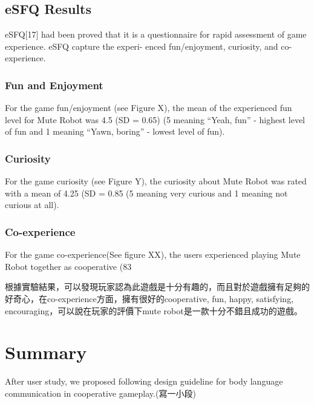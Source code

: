 \documentclass{sigchi}
\begin{document}
\subsection{eSFQ Results}

eSFQ[17] had been proved that it is a questionnaire for rapid assessment of game experience. eSFQ capture the experi- enced fun/enjoyment, curiosity, and co-experience. 


\subsubsection{Fun and Enjoyment}
For the game fun/enjoyment (see Figure X), the mean of the experienced fun level for Mute Robot was 4.5 (SD = 0.65) (5 meaning “Yeah, fun” - highest level of fun and 1 meaning “Yawn, boring” - lowest level of fun). 

\subsubsection{Curiosity}
For the game curiosity (see Figure Y), the curiosity about Mute Robot was rated with a mean of 4.25 (SD = 0.85 (5 meaning very curious and 1 meaning not curious at all).

\subsubsection{Co-experience}

For the game co-experience(See figure XX), the users experienced playing Mute Robot together as cooperative (83%


根據實驗結果，可以發現玩家認為此遊戲是十分有趣的，而且對於遊戲擁有足夠的好奇心，在co-experience方面，擁有很好的cooperative, fun, happy, satisfying, encouraging，可以說在玩家的評價下mute robot是一款十分不錯且成功的遊戲。

\section{Summary}

After user study, we proposed following design guideline for body language communication in cooperative gameplay.(寫一小段)
\end{document}

